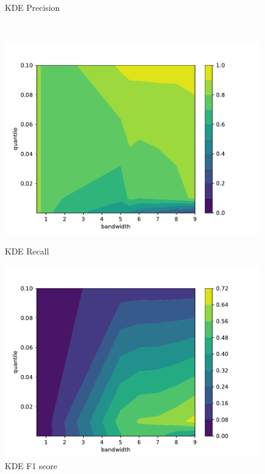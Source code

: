 \begin{figure}[p]
\begin{minipage}[t]{0.5\textwidth}
        \caption{KDE Precision}
    \end{minipage}
    \\
    \begin{minipage}[t]{0.5\textwidth}
        \vspace{0pt}
        \includegraphics[width=\textwidth]{images/kde-recall.pdf}
        \caption{KDE Recall}
    \end{minipage}
    \hfill
    \begin{minipage}[t]{0.5\textwidth}
        \vspace{0pt}
        \includegraphics[width=\textwidth]{images/kde-f1.pdf}
        \caption{KDE F1 score}
    \end{minipage}
\end{figure}

